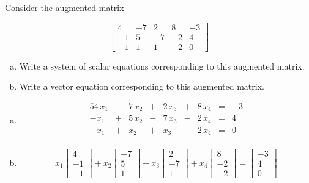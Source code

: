 
\begin{exerciseStatement}


 Consider the augmented matrix 

\[ \left[\begin{array}{cccc|c}
4 & -7 & 2 & 8 & -3 \\
-1 & 5 & -7 & -2 & 4 \\
-1 & 1 & 1 & -2 & 0
\end{array}\right] \]
\begin{enumerate}[(a)]
\item  Write a system of scalar equations corresponding to this augmented matrix. 
\item  Write a vector equation corresponding to this augmented matrix. 
\end{enumerate}
    
\end{exerciseStatement}
    
\begin{exerciseAnswer} 

\begin{enumerate}[(a)]
\item 
\begin{alignat*}{5} 4 \, x_{1} &-& 7 \, x_{2} &+& 2 \, x_{3} &+& 8 \, x_{4} &=& -3 \\-x_{1} &+& 5 \, x_{2} &-& 7 \, x_{3} &-& 2 \, x_{4} &=& 4 \\-x_{1} &+& x_{2} &+& x_{3} &-& 2 \, x_{4} &=& 0 \\ \end{alignat*}
            
\item \[ x_{1} \left[\begin{array}{c}
4 \\
-1 \\
-1
\end{array}\right] + x_{2} \left[\begin{array}{c}
-7 \\
5 \\
1
\end{array}\right] + x_{3} \left[\begin{array}{c}
2 \\
-7 \\
1
\end{array}\right] + x_{4} \left[\begin{array}{c}
8 \\
-2 \\
-2
\end{array}\right] = \left[\begin{array}{c}
-3 \\
4 \\
0
\end{array}\right] \]
\end{enumerate}
    
\end{exerciseAnswer}
    
